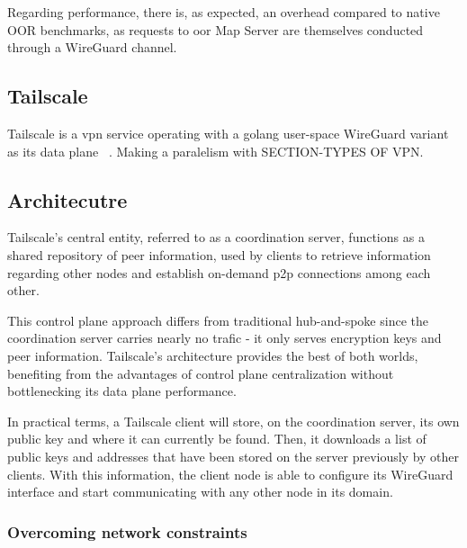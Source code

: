\documentclass[11pt,twoside,a4paper]{report}
\begin{document}
Regarding performance, there is, as expected, an overhead compared to native OOR benchmarks, as requests to \ac{oor} Map Server are themselves conducted through a WireGuard channel.

\subsection{Tailscale}

Tailscale is a \ac{vpn} service operating with a golang user-space WireGuard variant as its data plane ~\cite{tailscale2020online}. Making a paralelism with SECTION-TYPES OF VPN.


\subsection{Architecutre}

Tailscale's central entity, referred to as a coordination server, functions as a shared repository of peer information, used by clients to retrieve information regarding other nodes and establish on-demand \ac{p2p} connections among each other.

This control plane approach differs from traditional hub-and-spoke since the coordination server carries nearly no trafic - it only serves encryption keys and peer information. Tailscale's architecture provides the best of both worlds, benefiting from the advantages of control plane centralization without bottlenecking its data plane performance.

In practical terms, a Tailscale client will store, on the coordination server, its own public key and where it can currently be found. Then, it downloads a list of public keys and addresses that have been stored on the server previously by other clients. With this information, the client node is able to configure its WireGuard interface and start communicating with any other node in its domain.

\subsubsection{Overcoming network constraints}
\end{document}
